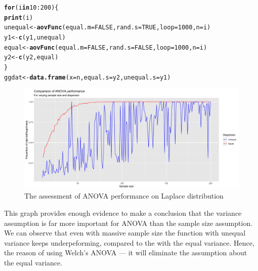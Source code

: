 \documentclass{article}\usepackage[]{graphicx}\usepackage[]{color}
\makeatletter
\newcommand{\hlnum}[1]{\textcolor[rgb]{0.686,0.059,0.569}{#1}}%
\newcommand{\hlopt}[1]{\textcolor[rgb]{0,0,0}{#1}}%
\newcommand{\hlstd}[1]{\textcolor[rgb]{0.345,0.345,0.345}{#1}}%
\newcommand{\hlkwa}[1]{\textcolor[rgb]{0.161,0.373,0.58}{\textbf{#1}}}%
\newcommand{\hlkwb}[1]{\textcolor[rgb]{0.69,0.353,0.396}{#1}}%
\newcommand{\hlkwc}[1]{\textcolor[rgb]{0.333,0.667,0.333}{#1}}%
\newcommand{\hlkwd}[1]{\textcolor[rgb]{0.737,0.353,0.396}{\textbf{#1}}}%
\newenvironment{kframe}{%
 \def\at@end@of@kframe{}%
 \ifinner\ifhmode%
  \def\at@end@of@kframe{\end{minipage}}%
  \begin{minipage}{\columnwidth}%
 \fi\fi%
 \def\FrameCommand##1{\hskip\@totalleftmargin \hskip-\fboxsep
 \colorbox{shadecolor}{##1}\hskip-\fboxsep
     \hskip-\linewidth \hskip-\@totalleftmargin \hskip\columnwidth}%
 \MakeFramed {\advance\hsize-\width
   \@totalleftmargin\z@ \linewidth\hsize
   \@setminipage}}%
 {\par\unskip\endMakeFramed%
 \at@end@of@kframe}
\newenvironment{knitrout}{}{} %
\makeatother
\begin{document}
\begin{enumerate}
\begin{enumerate}
\begin{knitrout}
\begin{kframe}
\begin{alltt}
\hlkwa{for}\hlstd{(i} \hlkwa{in} \hlnum{10}\hlopt{:}\hlnum{200}\hlstd{)\{}
  \hlkwd{print}\hlstd{(i)}
  \hlstd{unequal}\hlkwb{<-}\hlkwd{aovFunc}\hlstd{(}\hlkwc{equal.m}\hlstd{=}\hlnum{FALSE}\hlstd{,} \hlkwc{rand.s}\hlstd{=}\hlnum{TRUE}\hlstd{,} \hlkwc{loop}\hlstd{=}\hlnum{1000}\hlstd{,} \hlkwc{n}\hlstd{=i)}
  \hlstd{y1}\hlkwb{<-}\hlkwd{c}\hlstd{(y1, unequal)}
  \hlstd{equal}\hlkwb{<-}\hlkwd{aovFunc}\hlstd{(}\hlkwc{equal.m}\hlstd{=}\hlnum{FALSE}\hlstd{,} \hlkwc{rand.s}\hlstd{=}\hlnum{FALSE}\hlstd{,} \hlkwc{loop}\hlstd{=}\hlnum{1000}\hlstd{,} \hlkwc{n}\hlstd{=i)}
  \hlstd{y2}\hlkwb{<-}\hlkwd{c}\hlstd{(y2, equal)}
\hlstd{\}}
\hlstd{ggdat}\hlkwb{<-}\hlkwd{data.frame}\hlstd{(}\hlkwc{x}\hlstd{=n,} \hlkwc{equal.s}\hlstd{=y2,} \hlkwc{unequal.s}\hlstd{=y1)}
\end{alltt}
\end{kframe}
\end{knitrout}

\begin{figure}[H]
\begin{center}
\includegraphics[scale=0.40]{Rplot.png}
\caption{The assessment of ANOVA performance on Laplace distribution}
\label{p2plot2}
\end{center}
\end{figure}

This graph provides enough evidence to make a conclusion that the variance assumption is far more important for ANOVA than the sample size assumption. We can observe that even with massive sample size the function with unequal variance keeps underpeforming, compared to the with the equal variance. Hence, the reason of using Welch's ANOVA — it will eliminate the assumption about the equal variance.


\end{enumerate}
\end{enumerate}
\end{document}
